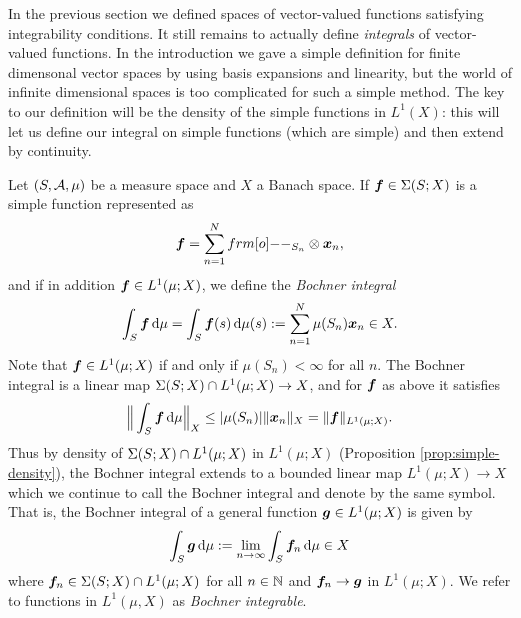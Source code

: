 In the previous section we defined spaces of vector-valued functions satisfying integrability conditions.
It still remains to actually define \emph{integrals} of vector-valued functions.
In the introduction we gave a simple definition for finite dimensonal vector spaces by using basis expansions and linearity, but the world of infinite dimensional spaces is too complicated for such a simple method.
The key to our definition will be the density of the simple functions in $L^1(X)$: this will let us define our integral on simple functions (which are simple) and then extend by continuity.

Let $(S,\mathcal{A},\mu)$ be a measure space and $X$ a Banach space.
If $\bm{f} \in \Sigma(S;X)$ is a simple function represented as
\begin{equation*}
  \mb{f} = \sum_{n=1}^N \1_{S_n} \otimes \mb{x}_n ,
\end{equation*}
and if in addition $\bm{f} \in L^1(\mu;X)$, we define the \emph{Bochner integral}
\begin{equation*}
  \int_S \bm{f} \, \mathrm{d}\mu = \int_S \bm{f}(s) \, \mathrm{d} \mu(s) := \sum_{n=1}^N \mu(S_n) \bm{x}_n \in X.
\end{equation*}
Note that $\bm{f} \in L^1(\mu;X)$ if and only if $\mu(S_n) < \infty$ for all $n$.
The Bochner integral is a linear map $\Sigma(S;X) \cap L^1(\mu;X) \to X$, and for $\bm{f}$ as above it satisfies
\begin{equation*}
  \Big\| \int_S \bm{f} \, \mathrm{d} \mu \Big\|_X \leq |\mu(S_n)| \|\bm{x}_n\|_X = \|\bm{f}\|_{L^1(\mu;X)}.
\end{equation*}
Thus by density of $\Sigma(S;X) \cap L^1(\mu;X)$ in $L^1(\mu;X)$ (Proposition \ref{prop:simple-density}), the Bochner integral extends to a bounded linear map $L^1(\mu;X) \to X$ which we continue to call the Bochner integral and denote by the same symbol.
That is, the Bochner integral of a general function $\bm{g} \in L^1(\mu;X)$ is given by 
\begin{equation*}
  \int_S \bm{g} \, \mathrm{d}\mu := \lim_{n \to \infty} \int_S \bm{f}_n \, \mathrm{d}\mu \in X
\end{equation*}
where $\bm{f}_n \in \Sigma(S;X) \cap L^1(\mu;X)$ for all $n \in \mathbb{N}$ and $\bm{f}_n \to \bm{g}$ in $L^1(\mu;X)$.
We refer to functions in $L^1(\mu,X)$ as \emph{Bochner integrable}.


